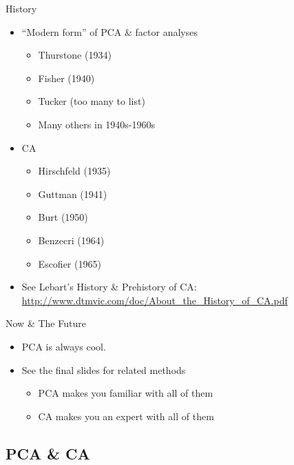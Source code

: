 \documentclass[
  ignorenonframetext,
]{beamer}
\providecommand{\tightlist}{%
  \setlength{\itemsep}{0pt}\setlength{\parskip}{0pt}}
\begin{document}
\begin{frame}{History}
\protect\hypertarget{history-1}{}

\begin{itemize}[<+->]
\tightlist
\item
  ``Modern form'' of PCA \& factor analyses

  \begin{itemize}[<+->]
  \tightlist
  \item
    Thurstone (1934)
  \item
    Fisher (1940)
  \item
    Tucker (too many to list)
  \item
    Many others in 1940s-1960s
  \end{itemize}
\item
  CA

  \begin{itemize}[<+->]
  \tightlist
  \item
    Hirschfeld (1935)
  \item
    Guttman (1941)
  \item
    Burt (1950)
  \item
    Benzecri (1964)
  \item
    Escofier (1965)
  \end{itemize}
\item
  See Lebart's History \& Prehistory of CA:
  \url{http://www.dtmvic.com/doc/About_the_History_of_CA.pdf}
\end{itemize}

\end{frame}

\begin{frame}{Now \& The Future}
\protect\hypertarget{now-the-future}{}

\begin{itemize}[<+->]
\tightlist
\item
  PCA is always cool.
\item
  See the final slides for related methods

  \begin{itemize}[<+->]
  \tightlist
  \item
    PCA makes you familiar with all of them
  \item
    CA makes you an expert with all of them
  \end{itemize}
\end{itemize}

\end{frame}

\hypertarget{pca-ca}{%
\subsection{PCA \& CA}\label{pca-ca}}
\end{document}
